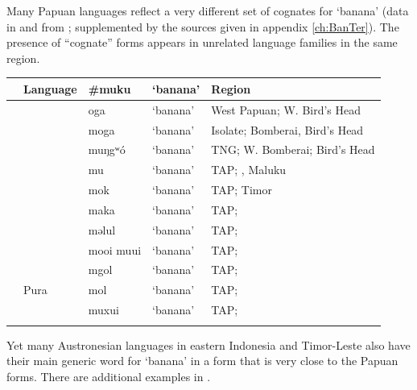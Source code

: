 Many Papuan languages reflect a very different set of cognates
for ‘banana’ (data in  and  from
\citet{DenhamDonohue2009}; supplemented
by the sources given in appendix \ref{ch:BanTer}).
The presence of “cognate” forms appears in unrelated language
families in the same region.

{\wg\begin{xltabular}{\linewidth}{>{\hspace{-\tabcolsep}}l<{\hspace{-\tabcolsep}}>{\hspace{-\tabcolsep}\enspace}llll}
\lsptoprule
{}		&	Language	&	{\#}muku	&	‘banana’	&	Region		\\ \midrule \hhline{~}
	&		&	oga	&	‘banana’	&	West Papuan; W. Bird’s Head		\\
	&		&	moga	&	‘banana’	&	Isolate; Bomberai, Bird’s Head		\\
	&		&	muŋgʷó	&	‘banana’	&	TNG; W. Bomberai; Bird’s Head		\\
	&		&	mu	&	‘banana’	&	TAP; , Maluku		\\
	&		&	mok	&	‘banana’	&	TAP; Timor		\\
	&		&	maka	&	‘banana’	&	TAP; 		\\
	&		&	məlul	&	‘banana’	&	TAP; 		\\
	&		&	mooi {\tl} muui	&	‘banana’	&	TAP; 		\\
	&		&	mgol\footnotemark 	&	‘banana’	&	TAP; 		\\
	&	Pura	&	mol	&	‘banana’	&	TAP; 		\\
	&		&	muxui	&	‘banana’	&	TAP; 		\\
\lspbottomrule
\end{xltabular}\addtocounter{table}{-1}}
		
Yet many Austronesian languages in eastern Indonesia
and Timor-Leste also have their main generic word for ‘banana’
in a form that is very close to the Papuan forms.
There are additional examples in \citet{DenhamDonohue2009}.

